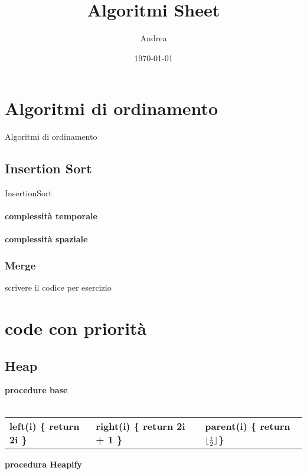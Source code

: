\documentclass{article}
\title{Algoritmi Sheet}
\author{Andrea}
\date{\today}
\DeclarePairedDelimiter\floor{\lfloor}{\rfloor}
\begin{document}
\maketitle
\tableofcontents
\newpage

\section{Algoritmi di ordinamento}
Algoritmi di ordinamento 
\subsection{Insertion Sort}
\IncMargin{1em} %
\begin{algorithm}[H] 
\caption{InsertionSort\label{IR}}
\end{algorithm}

\paragraph{complessità temporale}
\paragraph{complessità spaziale}

\newpage

\subsubsection{Merge}


scrivere il codice per esercizio

\begin{algorithm}
\SetAlgoLined
{}
\end{algorithm}


\newpage

\section{code con priorità}
\subsection{Heap}

\textbf{procedure base} 
\\
\\
\begin{tabular}{|l|l|l|}

\textbf{left(i) \{ return 2i \} } 
& \textbf{right(i) \{ return 2i + 1 \} }
& \textbf{parent(i) \{ return $\floor{\frac{i}{2}}$\}} \\
\end{tabular}

\textbf{procedura Heapify}
\begin{algorithm}
    
\end{algorithm}
\end{document}

